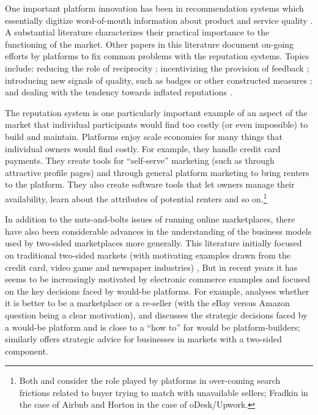 \documentclass[11pt]{article}
\begin{document}
One important platform innovation has been in recommendation systems which essentially digitize word-of-mouth information about product and service quality \cite{dellarocas2003digitization}. 
A substantial literature characterizes their practical importance \cite{cabral2010dynamics, resnick2000reputation, resnick2002trust} to the functioning of the market.
Other papers in this literature document on-going efforts by platforms to fix common problems with the reputation systems.
Topics include: reducing the role of reciprocity \citep{bolton2013engineering};
incentivizing the provision of feedback \cite{fradkin2015bias}; 
introducing new signals of quality, such as badges or other constructed measures \citep{hui2014lemon, nosko2015limits}; 
and dealing with the tendency towards inflated reputations \citep{horton2015reputation}.  

The reputation system is one particularly important example of an aspect of the market that individual participants would find too costly (or even impossible) to build and maintain. 
Platforms enjoy scale economies for many things that individual owners would find costly. 
For example, they handle credit card payments. 
They create tools for ``self-serve'' marketing (such as through attractive profile pages) and through general platform marketing to bring renters to the platform. 
They also create software tools that let owners manage their availability, learn about the attributes of potential renters and so on.\footnote{
  Both \cite{horton2014misdirected} and \cite{fradkin2013search} consider the role played by platforms in over-coming search frictions related to buyer trying to match with unavailable sellers;
  Fradkin in the case of Airbnb and Horton in the case of oDesk/Upwork. 
}

In addition to the nuts-and-bolts issues of running online marketplaces, there have also been considerable advances in the understanding of the business models used by two-sided marketplaces more generally. 
This literature initially focused on traditional two-sided markets (with motivating examples drawn from the credit card, video game and  newspaper industries) \cite{rochet2003platform, rochet2006two}, 
But in recent years it has seems to be increasingly motivated by electronic commerce examples and focused on the key decisions faced by would-be platforms.
For example, \cite{hagiu2014marketplace} analyses whether it is better to be a marketplace or a re-seller (with the eBay versus Amazon question being a clear motivation), and \cite{hagiu2014strategic} discusses the strategic decisions faced by a would-be platform and is close to a ``how to'' for would be platform-builders; similarly \cite{eisenmann2006strategies} offers strategic advice for businesses in markets with a two-sided component.  
\end{document}
